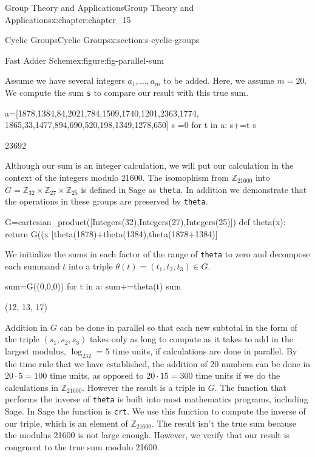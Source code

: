 \documentclass[oneside,10pt,]{book}
\newcommand{\mono}[1]{\texttt{#1}}
\numberwithin{equation}{section}
\begin{document}
\begin{chapterptx}{Group Theory and Applications}{}{Group Theory and Applications}{}{}{x:chapter:chapter_15}
\begin{sectionptx}{Cyclic Groups}{}{Cyclic Groups}{}{}{x:section:s-cyclic-groups}
\begin{figureptx}{Fast Adder Scheme}{x:figure:fig-parallel-sum}{}
\begin{image}{0.15}{0.7}{0.15}
\end{image}%
\tcblower
\end{figureptx}%
Assume we have several integers \(a_1, \ldots , a_m\) to be added.  Here, we assume \(m= 20\). We compute the sum \mono{s} to compare our result with this true sum.%
\begin{sageinput}
a=[1878,1384,84,2021,784,1509,1740,1201,2363,1774,
   1865,33,1477,894,690,520,198,1349,1278,650]
s =0
for t in a:
    s+=t
s
\end{sageinput}
\begin{sageoutput}
23692
\end{sageoutput}
Although our sum is an integer calculation, we will put our calculation in the context of the integers modulo 21600.  The isomophism from \(\mathbb{Z}_{21600}\) into \(G=\mathbb{Z}_{32}\times \mathbb{Z}_{27}\times \mathbb{Z}_{25}\) is defined in Sage as \mono{theta}.   In addition we demonstrate that the operations in these groups are preserved by \mono{theta}.%
\begin{sageinput}
G=cartesian_product([Integers(32),Integers(27),Integers(25)])
def theta(x):
    return G((x%
[theta(1878)+theta(1384),theta(1878+1384)]
\end{sageinput}
\begin{sageoutput}
[(30, 22, 12), (30, 22, 12)]
\end{sageoutput}
We initialize the sums in each factor of the range of \mono{theta} to zero and decompose each summand \(t\) into a triple \(\theta(t)=\left(t_1,t_2,t_3\right)\in G\).%
\begin{sageinput}
sum=G((0,0,0))
for t in a:
    sum+=theta(t)
sum
\end{sageinput}
\begin{sageoutput}
(12, 13, 17)
\end{sageoutput}
Addition in \(G\) can be done in parallel so that each new subtotal in the form of the triple \((s_1,s_2, s_3)\)  takes only as long to compute as it takes to add in the largest modulus, \(\log _232=5\) time units, if calculations are done in parallel. By the time rule that we have established, the addition of 20 numbers can be done in \(20\cdot 5= 100\) time units, as opposed to \(20\cdot 15 =300\) time units if we do the calculations in \(\mathbb{Z}_{21600}\).  However the result is a triple in \(G\).  The function that performs the inverse of \mono{theta} is built into most mathematics programs, including Sage.  In Sage the function is \mono{crt}.  We use this function to compute the inverse of our triple, which is an element of \(\mathbb{Z}_{21600}\).   The result isn't the true sum because the modulus 21600 is not large enough.  However, we verify that our result is congruent to the true sum modulo 21600.%

\end{sectionptx}
\end{chapterptx}
\end{document}
